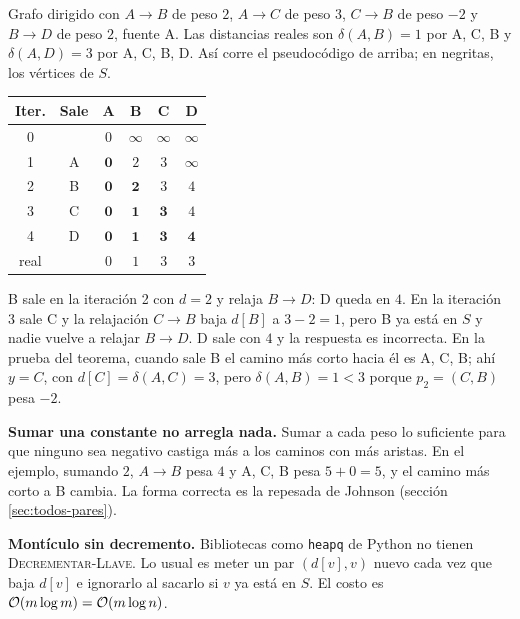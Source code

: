 \documentclass[11pt,letterpaper]{article}
\begin{document}
\begin{ejemplo}
  \label{ej:dijkstra-arista-negativa}
  Grafo dirigido con $A \to B$ de peso $2$, $A \to C$ de peso $3$,
  $C \to B$ de peso $-2$ y $B \to D$ de peso $2$, fuente A. Las
  distancias reales son $\delta(A, B) = 1$ por A, C, B y
  $\delta(A, D) = 3$ por A, C, B, D. Así corre el pseudocódigo de
  arriba; en negritas, los vértices de $S$.
  \begin{center}
  \small
  \begin{tabular}{cccccc}
    \toprule
    \textbf{Iter.} & \textbf{Sale} & A & B & C & D \\
    \midrule
    0 & & $0$ & $\infty$ & $\infty$ & $\infty$ \\
    1 & A & $\mathbf{0}$ & $2$ & $3$ & $\infty$ \\
    2 & B & $\mathbf{0}$ & $\mathbf{2}$ & $3$ & $4$ \\
    3 & C & $\mathbf{0}$ & $\mathbf{1}$ & $\mathbf{3}$ & $4$ \\
    4 & D & $\mathbf{0}$ & $\mathbf{1}$ & $\mathbf{3}$ & $\mathbf{4}$
      \\
    \midrule
    real & & $0$ & $1$ & $3$ & $3$ \\
    \bottomrule
  \end{tabular}
  \end{center}
  B sale en la iteración 2 con $d = 2$ y relaja $B \to D$: D queda en
  $4$. En la iteración 3 sale C y la relajación $C \to B$ baja $d[B]$
  a $3 - 2 = 1$, pero B ya está en $S$ y nadie vuelve a relajar
  $B \to D$. D sale con $4$ y la respuesta es incorrecta. En la
  prueba del teorema, cuando sale B el camino más corto hacia él es
  A, C, B; ahí $y = C$, con $d[C] = \delta(A, C) = 3$, pero
  $\delta(A, B) = 1 < 3$ porque $p_2 = (C, B)$ pesa $-2$.
\end{ejemplo}

\begin{ojo}
  \textbf{Sumar una constante no arregla nada.} Sumar a cada peso lo
  suficiente para que ninguno sea negativo castiga más a los caminos
  con más aristas. En el ejemplo, sumando $2$, $A \to B$ pesa $4$ y
  A, C, B pesa $5 + 0 = 5$, y el camino más corto a B cambia. La forma
  correcta es la repesada de Johnson (sección \ref{sec:todos-pares}).

  \smallskip
  \textbf{Montículo sin decremento.} Bibliotecas como \texttt{heapq}
  de Python no tienen \textsc{Decrementar-Llave}. Lo usual es meter un
  par $(d[v], v)$ nuevo cada vez que baja $d[v]$ e ignorarlo al
  sacarlo si $v$ ya está en $S$. El costo es
  $\mathcal{O}\!\left(m \log m\right) = \mathcal{O}\!\left(m \log n\right)$.
\end{ojo}
\end{document}
